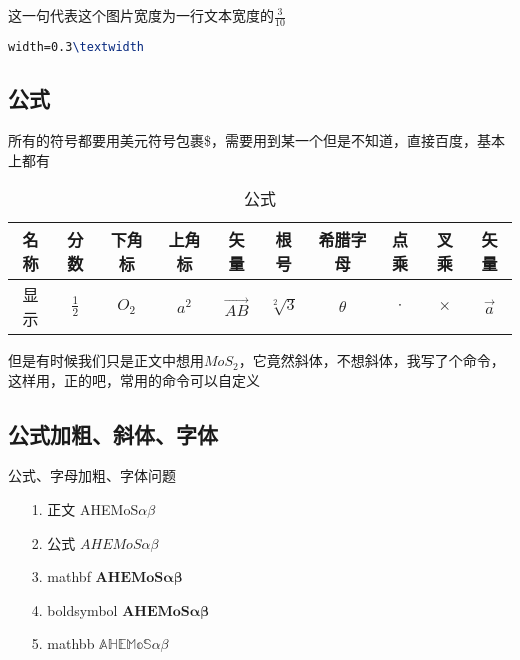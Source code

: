 \documentclass[AutoFakeBold]{LZUThesis}
\begin{document}
这一句代表这个图片宽度为一行文本宽度的$\frac{3}{10}$
\begin{lstlisting}[language = tex]
width=0.3\textwidth
\end{lstlisting}





\subsection{公式}
\label{sub:公式}
所有的符号都要用美元符号包裹\$，需要用到某一个但是不知道，直接百度，基本上都有
\begin{table}[H]
    \centering
    \caption{公式}
    \begin{tabular}{cccccccccc} %
        \toprule
        名称 & 分数            & 下角标   & 上角标   & 矢量         & 根号            & 希腊字母     & 点乘      & 叉乘       & 矢量        \\
        \midrule
        显示 & $\frac{1}{2}$ & $O_2$ & $a^2$ & $\vec{AB}$ & $\sqrt[2]{3}$ & $\theta$ & $\cdot$ & $\times$ & $\vec{a}$ \\

        \bottomrule
    \end{tabular}
    \label{tbl_gs}
\end{table}

但是有时候我们只是正文中想用$MoS_2$，它竟然斜体，不想斜体，我写了个命令，这样用，正的吧，常用的命令可以自定义

\subsection{公式加粗、斜体、字体}

公式、字母加粗、字体问题

\begin{itemize}
    \item[1.] 正文 \qquad \quad AHEMoS$\alpha \beta$
    \item[2.] 公式 \qquad \quad $AHEMoS \alpha \beta$
    \item[3.] mathbf \qquad $\mathbf{AHEMoS\alpha \beta}$
    \item[4.] boldsymbol $\boldsymbol{AHEMoS\alpha \beta}$
    \item[5.] mathbb \qquad $\mathbb{AHEMoS\alpha \beta}$
\end{itemize}
\end{document}
